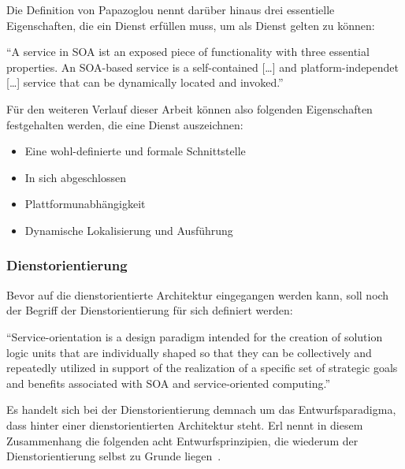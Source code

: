   Die Definition von Papazoglou nennt darüber hinaus drei essentielle Eigenschaften, die ein Dienst erfüllen muss, um als Dienst gelten zu können:

\begin{definition}\label{def:dienst_papazoglou_}
  "`A service in SOA ist an exposed piece of functionality with three essential properties. An SOA-based service is a self-contained [\ldots] and platform-independet [\ldots] service that can be dynamically located and invoked."'~\emph{\citep[S. 258]{web_services_principles_and_technology}}
\end{definition}

  Für den weiteren Verlauf dieser Arbeit können also folgenden Eigenschaften festgehalten werden, die eine Dienst auszeichnen:
  
  \begin{itemize}
    \item Eine wohl-definierte und formale Schnittstelle
    \item In sich abgeschlossen
    \item Plattformunabhängigkeit
    \item Dynamische Lokalisierung und Ausführung
  \end{itemize}


\subsubsection{Dienstorientierung} %
\label{ssub:definition_dienstorientierung}

  Bevor auf die dienstorientierte Architektur eingegangen werden kann, soll noch der Begriff der Dienstorientierung für sich definiert werden:

\begin{definition}[Dienstorientierung]\label{def:dienstorientierung}
  "`Service-orientation is a design paradigm intended for the creation of solution logic units that are individually shaped so that they can be collectively and repeatedly utilized in support of the realization of a specific set of strategic goals and benefits associated with SOA and service-oriented computing."'~\emph{\citep{erl2008soa}}
\end{definition}

  Es handelt sich bei der Dienstorientierung demnach um das Entwurfsparadigma, dass hinter einer dienstorientierten Architektur steht. Erl nennt in diesem Zusammenhang die folgenden acht Entwurfsprinzipien, die wiederum der Dienstorientierung selbst zu Grunde liegen~\citep{erl2008soa}.

